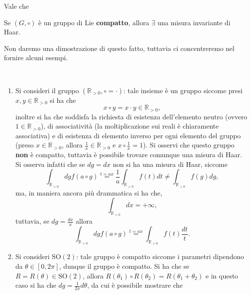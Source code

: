 Vale che
\begin{theorem}
    Se $(G, \circ)$ è un gruppo di Lie \textbf{compatto}, allora $\exists$ una misura invariante di Haar.
\end{theorem}
Non daremo una dimostrazione di questo fatto, tuttavia ci concentreremo nel fornire alcuni esempi.
\begin{example} \hspace{1cm} \\
    \begin{enumerate}[label=\protect\circled{\arabic*}]
        \item Si consideri il gruppo $(\mathbb{R}_{> 0}, \circ = \cdot)$: tale insieme è un gruppo siccome presi $x, y \in \mathbb{R}_{> 0}$ si ha che
        \begin{equation}
            x \circ y = x \cdot y \in \mathbb{R}_{> 0},
        \end{equation}
        inoltre si ha che soddisfa la richiesta di esistenza dell'elemento neutro (ovvero $1 \in \mathbb{R}_{> 0}$), di associatività (la moltiplicazione sui reali è chiaramente associativa)
        e di esistenza di elemento inverso per ogni elemento del gruppo (preso $x \in \mathbb{R}_{> 0}$, allora $\frac{1}{x} \in \mathbb{R}_{> 0}$ e $x \circ \frac{1}{x} = 1$). Si osservi che questo gruppo \textbf{non} è compatto, tuttavia è
        possibile trovare comunque una misura di Haar. Si osserva infatti che se $dg = dx$ non si ha una misura di Haar, siccome
        \begin{equation}
            \int_{\mathbb{R}_{> 0}} dg f(a \circ g) \stackrel{t = ax}{=} \frac{1}{a} \int_{\mathbb{R}_{> 0}} f(t) dt \neq \int_{\mathbb{R}_{> 0}} f(g)dg,  
        \end{equation}
        ma, in maniera ancora più drammatica si ha che,
        \begin{equation}
            \int_{\mathbb{R}_{> 0}} dx = +\infty,
        \end{equation}
        tuttavia, se $dg = \frac{dx}{x}$ allora
        \begin{equation}
            \int_{\mathbb{R}_{> 0}} dg f(a \circ g) \stackrel{t = ax}{=} \int_{\mathbb{R}_{> 0}} f(t) \frac{dt}{t}.
        \end{equation}
        \item Si consideri $\text{SO}(2)$: tale gruppo è compatto siccome i parametri dipendono da $\theta \in [0, 2 \pi]$, dunque il gruppo è compatto. Si ha che se $R = R(\theta) \in \text{SO}(2)$, allora $R(\theta_1) \circ R(\theta_2) = R(\theta_1 + \theta_2)$ e in questo caso si ha che $dg = \frac{1}{2 \pi} d\theta$, da cui è possibile mostrare che

\end{enumerate}
\end{example}
